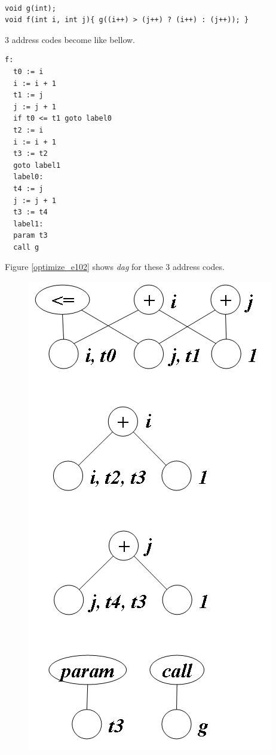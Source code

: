 \begin{Example}
\label{optimize_e101}
\begin{verbatim}

void g(int);
void f(int i, int j){ g((i++) > (j++) ? (i++) : (j++)); }
\end{verbatim}
3 address codes become like bellow.
\begin{verbatim}
f:
  t0 := i
  i := i + 1
  t1 := j
  j := j + 1
  if t0 <= t1 goto label0
  t2 := i
  i := i + 1
  t3 := t2
  goto label1
  label0:
  t4 := j
  j := j + 1
  t3 := t4
  label1:
  param t3
  call g
\end{verbatim}
Figure \ref{optimize_e102} shows {\em dag} for these 3 address codes.
\begin{figure}[htbp]
\begin{center}
\begin{htmlonly}
\includegraphics[width=0.556\linewidth,height=1.1\linewidth]{opt044.png}
\end{htmlonly}
\begin{latexonly}

\end{latexonly}
\end{center}
\end{figure}
\end{Example}
